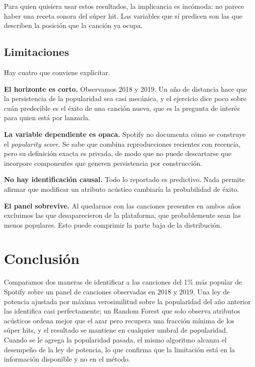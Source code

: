 \documentclass[11pt,a4paper]{article}
\begin{document}
Para quien quisiera usar estos resultados, la implicancia es incómoda: no
parece haber una receta sonora del súper hit. Las variables que sí predicen
son las que describen la posición que la canción ya ocupa.

\subsection{Limitaciones}

Hay cuatro que conviene explicitar.

\textbf{El horizonte es corto.} Observamos 2018 y 2019. Un año de distancia
hace que la persistencia de la popularidad sea casi mecánica, y el ejercicio
dice poco sobre cuán predecible es el éxito de una canción nueva, que es la
pregunta de interés para quien está por lanzarla.

\textbf{La variable dependiente es opaca.} Spotify no documenta cómo se
construye el \textit{popularity score}. Se sabe que combina reproducciones
recientes con recencia, pero su definición exacta es privada, de modo que no
puede descartarse que incorpore componentes que generen persistencia por
construcción.

\textbf{No hay identificación causal.} Todo lo reportado es predictivo. Nada
permite afirmar que modificar un atributo acústico cambiaría la probabilidad
de éxito.

\textbf{El panel sobrevive.} Al quedarnos con las canciones presentes en
ambos años excluimos las que desaparecieron de la plataforma, que
probablemente sean las menos populares. Esto puede comprimir la parte baja de
la distribución.

\section{Conclusión}

Comparamos dos maneras de identificar a las canciones del 1\% más popular de
Spotify sobre un panel de \nPanel{} canciones observadas en 2018 y 2019. Una
ley de potencia ajustada por máxima verosimilitud sobre la popularidad del
año anterior las identifica casi perfectamente; un Random Forest que solo
observa atributos acústicos ordena mejor que el azar pero recupera una fracción
mínima de los súper hits, y el resultado se mantiene en cualquier umbral de
popularidad. Cuando se le agrega la
popularidad pasada, el mismo algoritmo alcanza el desempeño de la ley de
potencia, lo que confirma que la limitación está en la información disponible
y no en el método.
\end{document}
